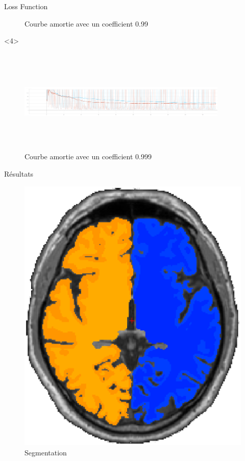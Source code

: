 \documentclass{beamer}
\begin{document}
\begin{frame}[t]{Loss Function}
\begin{onlyenv}
\begin{figure}
      \caption{Courbe amortie avec un coefficient 0.99}
      \label{courbe99}
    \end{figure}
  \end{onlyenv}
  \begin{onlyenv}<4>
    \begin{figure}
      \includegraphics[width=10cm, height=5cm]{annex/loss_smoothed_0999}
      \caption{Courbe amortie avec un coefficient 0.999}
      \label{courbe999}
    \end{figure}
  \end{onlyenv}
\end{frame}

\begin{frame}[t]{Résultats}
  \begin{figure}
    \includegraphics[scale=0.3]{annex/segmentation}
    \caption{Segmentation}
    \label{seg}
  \end{figure}
\end{frame}
\end{document}
